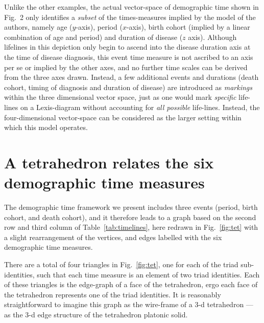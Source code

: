 \documentclass[12pt,oneside,a4paper,doublespacing]{article} %
\theoremstyle{definition}
\begin{document}
Unlike the other examples, the actual vector-space of demographic
time shown in \citet{brinks2014lexis} Fig.~2 only identifies a
\emph{subset} of the times-measures implied by the model of the
authors, namely age ($y$-axis), period ($x$-axis), birth cohort (implied by a
linear combination of age and period) and duration of disease ($z$ axis).
Although lifelines in this depiction only begin to ascend into the disease
duration axis at the time of disease diagnosis, this event time measure is not
ascribed to an axis per se or implied by the other axes, and no further time
scales can be derived from the three axes drawn.
Instead, a few additional events and durations (death cohort, timing of
diagnosis and duration of disease) are introduced as \emph{markings} within the three
dimensional vector space, just as one would mark \emph{specific} life-lines on
a Lexis-diagram without accounting for \emph{all possible} life-lines.
Instead, the four-dimensional vector-space can be considered as the larger
setting within which this model operates.


\FloatBarrier
\section{A tetrahedron relates the six demographic time measures}
\label{sec:tetrahedron}
The demographic time framework we present includes three events (period, birth
cohort, and death cohort), and it therefore leads to a graph
based on the second row and third column of Table~\ref{tab:timelines}, here
redrawn in Fig.~\ref{fig:tet} with a slight rearrangement of the
vertices, and edges labelled with the six demographic time measures.

There are a total of four triangles in Fig.~\ref{fig:tet}, one for each
of the triad sub-identities, such that each time measure is an element of two
triad identities. Each of these triangles is the
edge-graph of a face of the tetrahedron, ergo each face of the tetrahedron
represents one of the triad identities. It is reasonably straightforward to
imagine this graph as the wire-frame of a 3-d
tetrahedron --- as the 3-d edge structure of the tetrahedron platonic solid.
\end{document}
